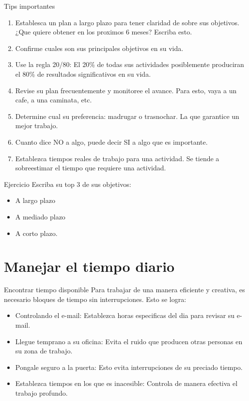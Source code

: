 \documentclass[
10pt,
aspectratio=169,
]{beamer}
\begin{document}
\begin{frame}[c]{Tips importantes}
\begin{enumerate}
\item Establesca un plan a largo plazo para tener claridad de sobre sus objetivos. ¿Que quiere obtener en los proximos 6 meses? Escriba esto.
\item Confirme cuales son sus principales objetivos en su vida.
\item Use la regla 20/80: El 20\% de todas sus actividades posiblemente produciran el 80\% de resultados significativos en su vida. 
\item Revise su plan frecuentemente y monitoree el avance. Para esto, vaya a un cafe, a una caminata, etc.
\item Determine cual su preferencia: madrugar o trasnochar. La que garantice un mejor trabajo.
\item Cuanto dice NO a algo, puede decir SI a algo que es importante.
\item Establezca tiempos reales de trabajo para una actividad.  Se tiende a sobreestimar el tiempo que requiere una actividad.  
\end{enumerate}
\end{frame}

\begin{frame}[c]{Ejercicio}
Escriba su top 3 de sus objetivos:
\begin{itemize}
\item A largo plazo
\item A mediado plazo
\item A corto plazo.
\end{itemize}
\end{frame}


\section{Manejar el tiempo diario}
\begin{frame}[c]{Encontrar tiempo disponible}
Para trabajar de una manera eficiente y creativa, es necesario bloques de tiempo sin interrupciones. Esto se logra:
\begin{itemize}
\item \alert{Controlando el e-mail}: Establezca horas especificas del dia para revisar su e-mail. 
\item \alert{Llegue temprano a su oficina}: Evita el ruido que producen otras personas en su zona de trabajo.
\item \alert{Pongale seguro a la puerta}: Esto evita interrupciones de su preciado tiempo. 
\item \alert{Establezca tiempos en los que es inacesible}: Controla de manera efectiva el trabajo profundo. 
\end{itemize}
\end{frame}
\end{document}
